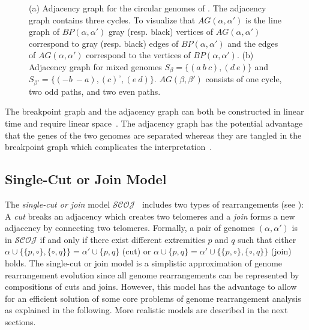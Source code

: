\documentclass{svmult}
\newcommand{\m}[1]{\mathcal{#1}}
\begin{document}
\begin{figure}
	\centering
	\quad
	\caption{(a) Adjacency graph for the circular genomes of
	. The adjacency graph contains three
	cycles. To visualize that 
	$AG(\alpha,\alpha')$ is the line graph of $BP(\alpha,\alpha')$ gray (resp.
	black) vertices of $AG(\alpha,\alpha')$ correspond to gray (resp. black) edges
	of $BP(\alpha,\alpha')$ and the edges of $AG(\alpha,\alpha')$ correspond to the
	vertices of $BP(\alpha,\alpha')$.
	(b) Adjacency graph for mixed genomes $S_{\beta}=\{(a~b~c),(d~e)\}$ and
	$S_{\beta'}=\{(-{b}~-{a}),(c)^\circ,(e~d)\}$.
	$AG(\beta,\beta')$ consists of one cycle, two odd paths, and two even
	paths.}
	\label{fig:adjacency_graph_circular}
\end{figure}

The breakpoint graph and the adjacency graph can both be constructed in linear time and require linear space~\cite{Bergeron_2006}. 
%
The adjacency graph has the potential advantage that the genes of the two genomes are separated whereas they are tangled 
in the breakpoint graph which complicates the interpretation~\cite{Friedberg_2008}. 

\subsection{Single-Cut or Join Model}
\label{sec:scoj}

The \emph{single-cut or join} model $\m{SCOJ}$~\cite{Feijao_2011}
includes two types of rearrangements (see ): A \emph{cut} breaks an adjacency which creates two telomeres 
and a \emph{join} forms a new adjacency by connecting two telomeres. 
%
Formally, a pair of genomes $(\alpha,\alpha')$ is in
$\m{SCOJ}$ if and only if there exist different extremities $p$ and $q$ such that 
either $\alpha \cup \{\{p,\circ\},\{\circ,q\}\}=\alpha' \cup \{p,q\}$ (cut) or $\alpha
\cup \{p,q\} =\alpha' \cup \{\{p,\circ\},\{\circ,q\}\}$ (join) holds.
The single-cut or join model is a simplistic approximation of genome
rearrangement evolution since all genome rearrangements can be
represented by compositions of cuts and joins. 
However, this model has the advantage to allow for an efficient solution of some core problems of 
genome rearrangement analysis as explained in the following. 
More realistic models are described in the next sections.
\end{document}
